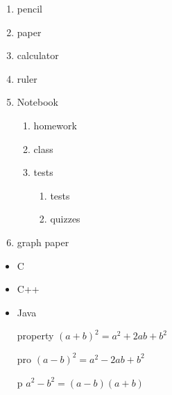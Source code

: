\documentclass[11pt]{article}
\begin{document}
\begin{enumerate}
\item pencil
\item paper
\item calculator
\item ruler
\item {
	Notebook
	\begin{enumerate}
	\item homework
	\item class
	\item tests
		\begin{enumerate}
		\item tests
		\item quizzes
		\end{enumerate}
	\end{enumerate}
}
\item graph paper
\end{enumerate}



\begin{itemize}
\item C
\item C++
\item Java
\end{itemize}

\begin{enumerate}
\item[property] $( a + b ) ^ 2 = a^2 + 2ab + b^2$
\item[pro] $(a-b)^2 = a^2 - 2ab + b^2$
\item[p] $a^2 - b^2 = (a-b)(a+b)$
\end{enumerate}
\end{document}
